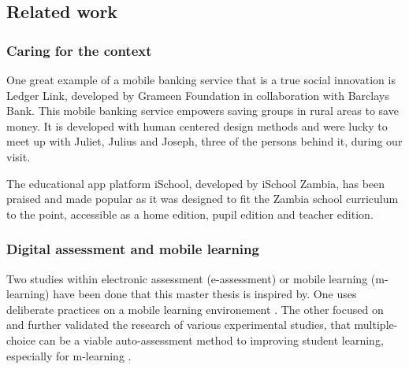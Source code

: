 \subsection{Related work}

\subsubsection{Caring for the context}

One great example of a mobile banking service that is a true social innovation is Ledger Link, developed by Grameen Foundation in collaboration with Barclays Bank. This mobile banking service empowers saving groups in rural areas to save money. It is developed with human centered design methods and were lucky to meet up with Juliet, Julius and Joseph, three of the persons behind it, during our visit. \cite{nissar-linkedin}

The educational app platform iSchool, developed by iSchool Zambia, has been praised and made popular as it was designed to fit the Zambia school curriculum to the point, accessible as a home edition, pupil edition and teacher edition.

\subsubsection{Digital assessment and mobile learning}

Two studies within electronic assessment (e-assessment) or mobile learning (m-learning) have been done that this master thesis is inspired by. One uses deliberate practices on a mobile learning environement \cite{yengin}. The other focused on and further validated the research of various experimental studies, that multiple-choice can be a viable auto-assessment method to improving student learning, especially for m-learning \cite{de-marcos}.
